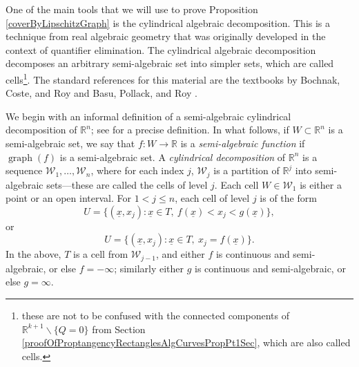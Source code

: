 \documentclass[letterpaper, reqno,11pt]{article}
\numberwithin{equation}{section}
\newcommand{\RR}{\mathbb{R}}
\numberwithin{thm}{section}
\theoremstyle{remark}
\begin{document}
One of the main tools that we will use to prove Proposition \ref{coverByLipschitzGraph} is the cylindrical algebraic decomposition. This is a technique from real algebraic geometry that was originally developed in the context of quantifier elimination.  The cylindrical algebraic decomposition decomposes an arbitrary semi-algebraic set into simpler sets, which are called cells\footnote{these are not to be confused with the connected components of $\RR^{k+1}\backslash \{Q=0\}$ from Section \ref{proofOfProptangencyRectanglesAlgCurvesPropPt1Sec}, which are also called cells.}. The standard references for this material are the textbooks by Bochnak, Coste, and Roy \cite{BCR} and Basu, Pollack, and Roy \cite{BPR}.

We begin with an informal definition of a semi-algebraic cylindrical decomposition of $\RR^n$; see \cite[Definition 5.1]{BPR} for a precise definition. In what follows, if $W\subset\RR^{n}$ is a semi-algebraic set, we say that $f\colon W\to\RR$ is a \emph{semi-algebraic function} if $\operatorname{graph}(f)$ is a semi-algebraic set. A \emph{cylindrical decomposition} of $\RR^n$ is a sequence $\mathcal{W}_1,\ldots,\mathcal{W}_n$, where for each index $j$, $\mathcal{W}_j$ is a partition of $\RR^j$ into semi-algebraic sets---these are called the cells of level $j$. Each cell $W\in\mathcal{W}_1$ is either a point or an open interval. For $1<j\leq n$, each cell of level $j$ is of the form 
\begin{equation}\label{UDecompType1}
U = \big\{(\underline x, x_j)\colon \underline x \in T,\ f(\underline x) < x_j < g(\underline x)\big\},
\end{equation}
or
\begin{equation}\label{UDecompType2}
U = \big\{(\underline x, x_{j})\colon \underline x \in T,\ x_j=f(\underline x)\big\}.
\end{equation}
In the above, $T$ is a cell from $\mathcal{W}_{j-1}$, and either $f$ is continuous and semi-algebraic, or else $f=-\infty$; similarly either $g$ is continuous and semi-algebraic, or else $g = \infty.$
\end{document}
